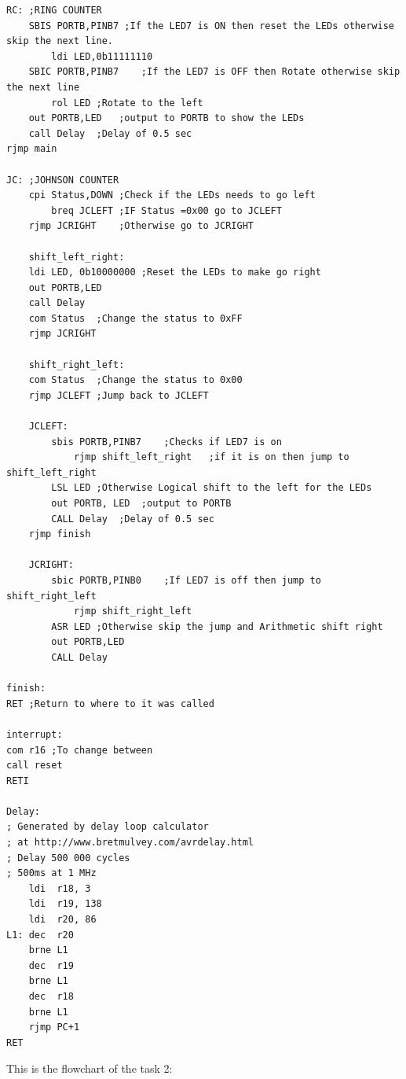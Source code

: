 \documentclass[a4paper,12pt]{article}
\begin{document}
\begin{lstlisting}
RC:	;RING COUNTER
	SBIS PORTB,PINB7 ;If the LED7 is ON then reset the LEDs otherwise skip the next line.
		ldi LED,0b11111110
	SBIC PORTB,PINB7	;If the LED7 is OFF then Rotate otherwise skip the next line 
		rol LED	;Rotate to the left 
	out PORTB,LED	;output to PORTB to show the LEDs
	call Delay	;Delay of 0.5 sec
rjmp main

JC:	;JOHNSON COUNTER
	cpi Status,DOWN	;Check if the LEDs needs to go left
		breq JCLEFT	;IF Status =0x00 go to JCLEFT
	rjmp JCRIGHT	;Otherwise go to JCRIGHT
	
	shift_left_right:
	ldi LED, 0b10000000	;Reset the LEDs to make go right
	out PORTB,LED
	call Delay
	com Status	;Change the status to 0xFF
	rjmp JCRIGHT

	shift_right_left:
	com Status	;Change the status to 0x00
	rjmp JCLEFT	;Jump back to JCLEFT

	JCLEFT:
		sbis PORTB,PINB7	;Checks if LED7 is on
			rjmp shift_left_right	;if it is on then jump to shift_left_right
		LSL LED ;Otherwise Logical shift to the left for the LEDs
		out PORTB, LED	;output to PORTB 
		CALL Delay	;Delay of 0.5 sec 
	rjmp finish
		
	JCRIGHT:
		sbic PORTB,PINB0	;If LED7 is off then jump to shift_right_left
			rjmp shift_right_left
		ASR LED	;Otherwise skip the jump and Arithmetic shift right
		out PORTB,LED
		CALL Delay

finish:
RET	;Return to where to it was called

interrupt:
com r16	;To change between 
call reset
RETI

Delay:
; Generated by delay loop calculator
; at http://www.bretmulvey.com/avrdelay.html
; Delay 500 000 cycles
; 500ms at 1 MHz
    ldi  r18, 3
    ldi  r19, 138
    ldi  r20, 86
L1: dec  r20
    brne L1
    dec  r19
    brne L1
    dec  r18
    brne L1
    rjmp PC+1
RET
\end{lstlisting}
\newpage
This is the flowchart of the task 2:
\end{document}
